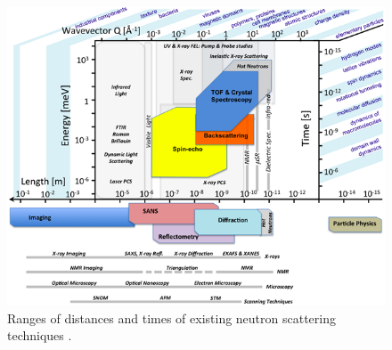 \begin{figure}[!ht]
	\begin{center}
		\includegraphics[width=\textwidth]{01_Introduction/figures/fig000_Time_Scale}
	\end{center}
	\caption[Ranges of distances and times of existing neutron scattering techniques]{Ranges of distances and times of existing neutron scattering techniques \cite{essNeutronProbe}.}
	\label{chap1:fig:Time_Scale}
\end{figure}
